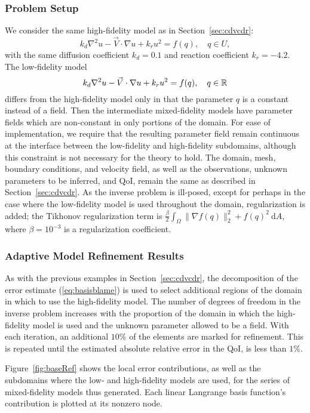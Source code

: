 \subsubsection{Problem Setup}
%
We consider the same high-fidelity model as in Section~\ref{sec:cdvcdr}:
\begin{equation}
k_d\nabla^2 u - \vec{V}\cdot\nabla u + k_ru^2= f(q),\quad q\in U,
\end{equation}
with the same diffusion coefficient $k_d = 0.1$  and reaction coefficient $k_r = -4.2$. The low-fidelity model
\begin{equation}
k_d\nabla^2 u - \vec{V}\cdot\nabla u + k_ru^2= f(q),\quad q\in{\mathbb{R}}
\end{equation}
differs from the high-fidelity model only in that the parameter $q$ is a constant instead of a field. Then the intermediate mixed-fidelity models have parameter fields which are non-constant in only portions of the domain. For ease of implementation, we require that the resulting parameter field remain continuous at the interface between the low-fidelity and high-fidelity subdomains, although this constraint is not necessary for the theory to hold. The domain, mesh, boundary conditions, and velocity field, as well as the observations, unknown parameters to be inferred, and QoI, remain the same as described in Section~\ref{sec:cdvcdr}. As the inverse problem is ill-posed, except for perhaps in the case where the low-fidelity model is used throughout the domain, regularization is added; the Tikhonov regularization term is $\frac{\beta}{2}\int_\Omega \|\nabla f(q)\|_2^2+f(q)^2\:\textrm{d}A$, where $\beta=10^{-3}$ is a regularization coefficient.
%
\subsubsection{Adaptive Model Refinement Results}
%
As with the previous examples in Section~\ref{sec:cdvcdr}, the decomposition of the error estimate (\ref{eq:basisblame}) is used to select additional regions of the domain in which to use the high-fidelity model. The number of degrees of freedom in the inverse problem increases with the proportion of the domain in which the high-fidelity model is used and the unknown parameter allowed to be a field. With each iteration, an additional $10\%$ of the elements are marked for refinement. This is repeated until the estimated absolute relative error in the QoI, is less than $1\%$.

Figure~\ref{fig:baseRef} shows the local error contributions, as well as the subdomains where the low- and high-fidelity models are used, for the series of mixed-fidelity models thus generated. Each linear Langrange basis function's contribution is plotted at its nonzero node.








